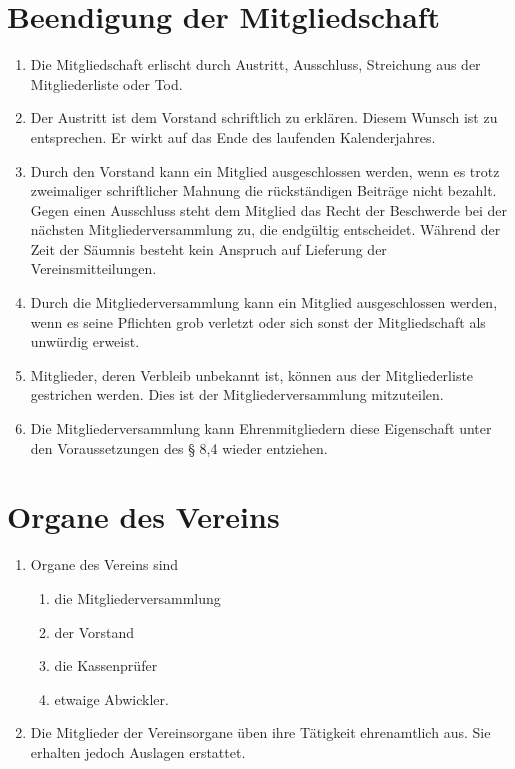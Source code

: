 \documentclass[11pt]{article}
\begin{document}
\section{Beendigung der Mitgliedschaft}
\begin{enumerate}[label=\arabic*)]
	\item Die Mitgliedschaft erlischt durch Austritt, Ausschluss, Streichung aus der Mitgliederliste oder Tod.
	\item Der Austritt ist dem Vorstand schriftlich zu erklären. Diesem Wunsch ist zu entsprechen. Er wirkt auf das Ende des laufenden Kalenderjahres.
	\item Durch den Vorstand kann ein Mitglied ausgeschlossen werden, wenn es trotz zweimaliger schriftlicher Mahnung die rückständigen Beiträge nicht bezahlt. Gegen einen Ausschluss steht dem Mitglied das Recht der Beschwerde bei der nächsten Mitgliederversammlung zu, die endgültig entscheidet. Während der Zeit der Säumnis besteht kein Anspruch auf Lieferung der Vereinsmitteilungen.
	\item Durch die Mitgliederversammlung kann ein Mitglied ausgeschlossen werden, wenn es seine Pflichten grob verletzt oder sich sonst der Mitgliedschaft als unwürdig erweist.
	\item Mitglieder, deren Verbleib unbekannt ist, können aus der Mitgliederliste gestrichen werden. Dies ist der Mitgliederversammlung mitzuteilen.
	\item Die Mitgliederversammlung kann Ehrenmitgliedern diese Eigenschaft unter den Voraussetzungen des § 8,4 wieder entziehen.
\end{enumerate}

\section{Organe des Vereins}
\begin{enumerate}[label=\arabic*)]
	\item Organe des Vereins sind
	\begin{enumerate}[label=\alph*)]
		\item die Mitgliederversammlung
		\item der Vorstand
		\item die Kassenprüfer
		\item etwaige Abwickler.
	\end{enumerate}
	\item Die Mitglieder der Vereinsorgane üben ihre Tätigkeit ehrenamtlich aus. Sie erhalten jedoch Auslagen erstattet.
\end{enumerate}
\end{document}
